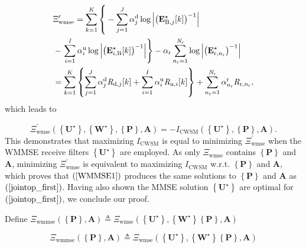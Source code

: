 \documentclass[9pt,journal]{IEEEtran}
\newcommand{\sizecorr}[1]{\makebox[0cm]{\phantom{$\displaystyle #1$}}}
\newcommand{\paren}[1]{\left({#1}\right)}
\newcommand{\bracket}[1]{{\left [{#1}\right ]}}
\newcommand{\braces}[1]{{\left\{ {#1}\right\}}}
\newcommand{\rr}{_\mathrm{r}}
\newcommand{\B}{\textrm{B}}
\newcommand{\rnr}{_{\mathrm{r},n_\mathrm{r}}}
\newcommand{\WiB}{\mathbf{W}_{\textrm{u},i}\bracket{k}}
\newcommand{\WBj}{\mathbf{W}_{\mathrm{d},j}\bracket{k}}
\theoremstyle{definition}
\begin{document}
\begin{IEEEproof}
\begin{align}
&\Xi^\prime_{\textrm{wmse}}=
\sum_{k=1}^{\mathit{K}}\left\lbrace
\sizecorr{\sum_{i=1}^I\alpha^\textrm{u}_i\paren{\log\left| \WiB\right|-\mathit{D}^\textrm{u}_i}}
-\sum_{j=1}^{\mathit{J}}\alpha^\textrm{d}_j\log\left|\paren{\mathbf{E}^\star_{\B,j}\bracket{k}}^{-1}\right|\right.\nonumber\\
&-\left.\sum_{i=1}^{\mathit{I}}\alpha^\textrm{u}_i\log\left|\paren{\mathbf{E}^{\star}_{i,\B}\bracket{k}}^{-1}\right|\right\rbrace -\alpha\rr\sum_{n\rr=1}^{\mathit{N}\rr}\log\left|\paren{\mathbf{E}^\star\rnr}^{-1}\right|\nonumber\\
&=\sum_{k=1}^K\braces{\sum_{j=1}^J\alpha^\textrm{d}_j\mathit{R}_{\textrm{d},j}\bracket{k}+\sum_{i=1}^I\alpha^\textrm{u}_i\mathit{R}_{\textrm{u},i}\bracket{k}}+\sum_{n\rr=1}^{\mathit{N}\rr}\alpha^\textrm{r}_{n\rr} \mathit{R}\rnr,%
\end{align}\normalsize
which leads to\par\noindent\small
\begin{equation}
\Xi^\prime_{\textrm{wmse}}\paren{\braces{\mathbf{U}^\star},\braces{\mathbf{W}^\star},\braces{\mathbf{P}},\mathbf{A}}=-\mathit{I}_{\textrm{CWSM}}\left(\braces{\mathbf{U}^\star},\braces{\mathbf{P}},\mathbf{A}\right).
\end{equation}\normalsize
This demonstrates that maximizing $\mathit{I}_{\textrm{CWSM}}$ is equal to minimizing $\Xi^\prime_{\textrm{wmse}}$ when the WMMSE receive filters $\braces{\mathbf{U}^\star}$ are employed. As only $\Xi_{\text{wmse}}$ contains $\braces{\mathbf{P}}$ and $\mathbf{A}$, minimizing $\Xi^\prime_{\textrm{wmse}}$ is equivalent to maximizing $\mathit{I}_{\textrm{CWSM}}$ w.r.t. $\braces{\mathbf{P}}$ and $\mathbf{A}$, which proves that $\paren{\ref{WMMSE1}}$ produces the same solutions to $\braces{\mathbf{P}}$ and $\mathbf{A}$ as $\paren{\ref{jointop_first}}$.  Having also shown the MMSE solution $\braces{\mathbf{U}^\star}$ are optimal for $\paren{\ref{jointop_first}}$, we conclude our proof. 
\end{IEEEproof}	
Define $\Xi_{\textrm{wmmse}}\paren{\braces{\mathbf{P}},\mathbf{A}}\triangleq\Xi_{\textrm{wmse}}\paren{\braces{\mathbf{U}^\star}, \braces{\mathbf{W}^\star} \braces{\mathbf{P}},\mathbf{A}}$ %
\iffalse
\par\noindent\small
\begin{equation}
\Xi_{\textrm{wmmse}}\paren{\braces{\mathbf{P}},\mathbf{A}}\triangleq\Xi_{\textrm{wmse}}\paren{\braces{\mathbf{U}^\star}, \braces{\mathbf{W}^\star} \braces{\mathbf{P}},\mathbf{A}}
\end{equation}\normalsize
\end{document}
